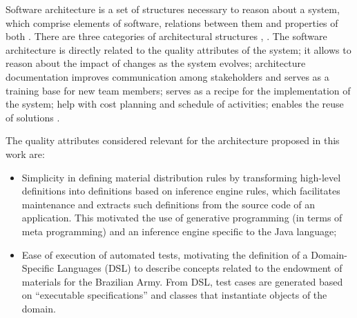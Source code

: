 Software architecture is a set of structures necessary to reason about a system, which comprise elements of software, relations between them and properties of both \cite{bass2013software}. There are three categories of architectural structures \cite{clements2011documenting}, \cite{bass2013software}. The software architecture is directly related to the quality attributes of the system; it allows to reason about the impact of changes as the system evolves; architecture documentation improves communication among stakeholders and serves as a training base for new team members; serves as a recipe for the implementation of the system; help with cost planning and schedule of activities; enables the reuse of solutions \cite{bass2013software}.


The quality attributes considered relevant for the architecture proposed in this work are:

\begin{itemize}


\item Simplicity in defining material distribution rules by transforming high-level definitions into definitions based on inference engine rules, which facilitates maintenance and extracts such definitions from the source code of an application. This motivated the use of generative programming (in terms of meta programming) and an inference engine specific to the Java language;


\item Ease of execution of automated tests, motivating the definition of a Domain-Specific Languages (DSL) to describe concepts related to the endowment of materials for the Brazilian Army. From DSL, test cases are generated based on ``executable specifications'' and classes that instantiate objects of the domain.

\end{itemize}



